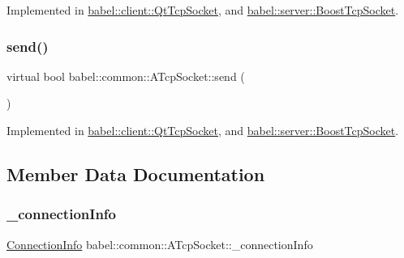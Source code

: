Implemented in \mbox{\hyperlink{classbabel_1_1client_1_1_qt_tcp_socket_ac79df4ffe6efc050afe567c596754e5c}{babel\+::client\+::\+Qt\+Tcp\+Socket}}, and \mbox{\hyperlink{classbabel_1_1server_1_1_boost_tcp_socket_a0f59c22aa0755aece70891287352bf5c}{babel\+::server\+::\+Boost\+Tcp\+Socket}}.

\mbox{\label{classbabel_1_1common_1_1_a_tcp_socket_a4c6b77b93cedcb874caa0a9cee6cad36}} 
\subsubsection{\texorpdfstring{send()}{send()}}
{\footnotesize\ttfamily virtual bool babel\+::common\+::\+A\+Tcp\+Socket\+::send (\begin{DoxyParamCaption}\item[{\mbox{\hyperlink{classbabel_1_1common_1_1_data_packet}{babel\+::common\+::\+Data\+Packet}}}]{ }\end{DoxyParamCaption})\hspace{0.3cm}{\ttfamily [pure virtual]}}



Implemented in \mbox{\hyperlink{classbabel_1_1client_1_1_qt_tcp_socket_a8f6bdb14b7b6742f11cf1d9e4e39e09d}{babel\+::client\+::\+Qt\+Tcp\+Socket}}, and \mbox{\hyperlink{classbabel_1_1server_1_1_boost_tcp_socket_a037e9440c226c8701b55b005d9f1eea4}{babel\+::server\+::\+Boost\+Tcp\+Socket}}.



\subsection{Member Data Documentation}
\mbox{\label{classbabel_1_1common_1_1_a_tcp_socket_a7da9857439a1ec09a294f836fc7f4953}} 
\subsubsection{\texorpdfstring{\+\_\+connection\+Info}{\_connectionInfo}}
{\footnotesize\ttfamily \mbox{\hyperlink{classbabel_1_1common_1_1_connection_info}{Connection\+Info}} babel\+::common\+::\+A\+Tcp\+Socket\+::\+\_\+connection\+Info\hspace{0.3cm}{\ttfamily [protected]}}



